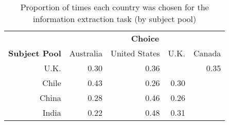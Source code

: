 \begin{table}[ht]
\centering
\caption{Proportion of times each country was chosen for the information extraction task (by subject pool)} 
\label{tab:iet}
\begin{tabular}{rrrrr}
  \hline & \multicolumn{4}{c}{\textbf{Choice}} \\ \cline{2-5} \textbf{Subject Pool} & Australia & United States & U.K. & Canada \\ 
  \hline
U.K. & 0.30 & 0.36 &  & 0.35 \\ 
  Chile & 0.43 & 0.26 & 0.30 &  \\ 
  China & 0.28 & 0.46 & 0.26 &  \\ 
  India & 0.22 & 0.48 & 0.31 &  \\ 
   \hline
\end{tabular}
\end{table}
